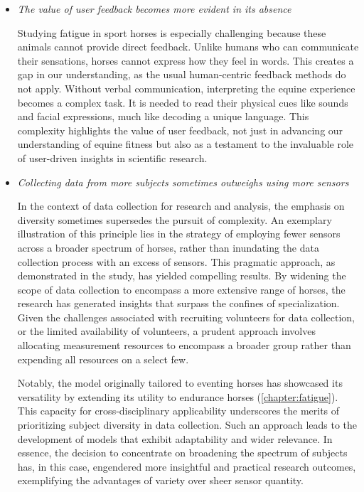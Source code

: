 \begin{itemize}[label={$\bullet$}, leftmargin=*]
\item{\textit{The value of user feedback becomes more evident in its absence}}

Studying fatigue in sport horses is especially challenging because these animals cannot provide direct feedback. Unlike humans who can communicate their sensations, horses cannot express how they feel in words. This creates a gap in our understanding, as the usual human-centric feedback methods do not apply. Without verbal communication, interpreting the equine experience becomes a complex task. It is needed to read their physical cues like sounds and facial expressions, much like decoding a unique language. This complexity highlights the value of user feedback, not just in advancing our understanding of equine fitness but also as a testament to the invaluable role of user-driven insights in scientific research.

\item{\textit{Collecting data from more subjects sometimes outweighs using more sensors}} 

In the context of data collection for research and analysis, the emphasis on diversity sometimes supersedes the pursuit of complexity. An exemplary illustration of this principle lies in the strategy of employing fewer sensors across a broader spectrum of horses, rather than inundating the data collection process with an excess of sensors. This pragmatic approach, as demonstrated in the study, has yielded compelling results. By widening the scope of data collection to encompass a more extensive range of horses, the research has generated insights that surpass the confines of specialization. Given the challenges associated with recruiting volunteers for data collection, or the limited availability of volunteers, a prudent approach involves allocating measurement resources to encompass a broader group rather than expending all resources on a select few. 

Notably, the model originally tailored to eventing horses has showcased its versatility by extending its utility to endurance horses (\ref{chapter:fatigue}). This capacity for cross-disciplinary applicability underscores the merits of prioritizing subject diversity in data collection. Such an approach leads to the development of models that exhibit adaptability and wider relevance. In essence, the decision to concentrate on broadening the spectrum of subjects has, in this case, engendered more insightful and practical research outcomes, exemplifying the advantages of variety over sheer sensor quantity.


\end{itemize}
